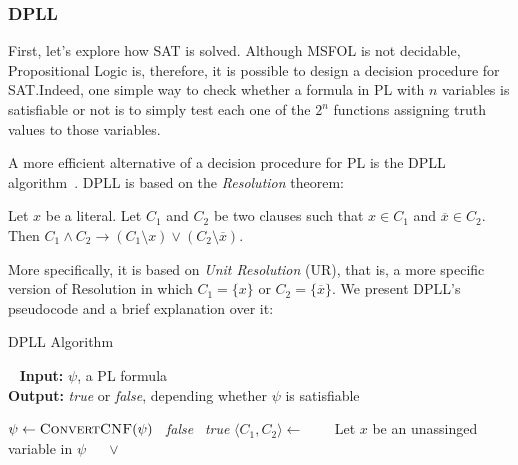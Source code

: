 \subsubsection{DPLL}

First, let’s explore how SAT is solved. Although MSFOL is not decidable, Propositional Logic is, therefore, it is possible to design a decision procedure for SAT.\@ Indeed, one simple way to check whether a formula in PL with $n$ variables is satisfiable or not is to simply test each one of the $2^{n}$ functions assigning truth values to those variables.

A more efficient alternative of a decision procedure for PL is the DPLL algorithm~\cite{dpll}. DPLL is based on the \textit{Resolution} theorem:

\begin{theorem}[Resolution]
Let $x$ be a literal. Let $C_{1}$ and $C_{2}$ be two clauses such that $x \in C_{1}$ and $\overline x \in C_{2}$. Then $C_{1} \wedge C_{2} \rightarrow (C_{1} \setminus x) \vee (C_{2} \setminus \overline x)$.
\end{theorem}

More specifically, it is based on \textit{Unit Resolution} (UR), that is, a more specific version of Resolution in which $C_{1} = \{x\}$ or $C_{2} = \{\overline x\}$. We present DPLL's pseudocode and a brief explanation over it:

\begin{algorithm}[H]
\caption{DPLL Algorithm}~\label{dpllAlgo}
\textbf{Input:} $\psi$, a PL formula\\
\textbf{Output:} \textit{true} or \textit{false}, depending whether $\psi$ is satisfiable
\begin{algorithmic}
\State $\psi \gets \Call{ConvertCNF}{\psi}$
  \State \Return~\textit{false}
  \State \Return~\textit{true}
\Else
    \State $\langle C_{1}, C_{2} \rangle \gets$  
    \State~\Return~
  \Else
    \State~Let $x$ be an unassinged variable in $\psi$
    \State~\Return~ $\vee$ 
  \EndIf
\EndIf
\EndFunction
\end{algorithmic}
\end{algorithm}

